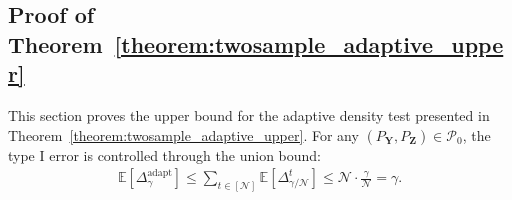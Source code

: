 \documentclass[twoside,11pt]{article}
\newcommand{\distClassGeneric}{\mathcal{P}}
\newcommand{\rvTwo}{Y}
\newcommand{\rvThree}{Z}
\newcommand{\vectorize}[1]{\mathbf{#1}}
\newcommand{\adaptiveBinNumIndex}{t}
\newcommand{\nTest}{\mathcal{N}} %
\newcommand{\maxErrorTypeOne}{\gamma} %
\newcommand{\adaptiveSingleTest}[1]{\Delta^{#1}}
\newcommand{\hypoNull}{\distClassGeneric_0}
\begin{document}
\begin{appendix}
	\section{Proof of Theorem~\ref{theorem:twosample_adaptive_upper}}\label{proof:twosample_adaptive}
	This section proves the upper bound for the adaptive  density test  presented in Theorem~\ref{theorem:twosample_adaptive_upper}. For any $(P_{\vectorize{\rvTwo}}, P_{\vectorize{\rvThree}}) \in \hypoNull$, the type I error is controlled through the union bound:
	\begin{align*}
		\mathbb{E}
		[	\Delta^{\text{adapt}}_{\maxErrorTypeOne}]
		\leq
		\sum_{{\adaptiveBinNumIndex} \in [\nTest]}
		\mathbb{E}
		[
		\adaptiveSingleTest{\adaptiveBinNumIndex}_{\maxErrorTypeOne/\nTest}
		]
		\leq
		\nTest \cdot \frac{\gamma}{\nTest} = \gamma.
	\end{align*}
	

\end{appendix}
\end{document}
